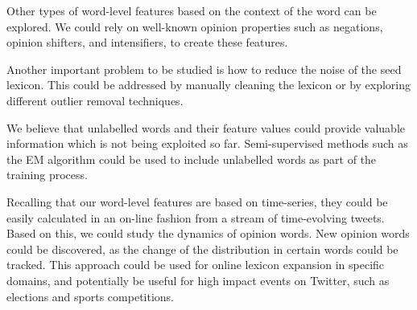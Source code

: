 \documentclass{sig-alternate}
\begin{document}
Other types of word-level features based on the context of the word can be explored. We could rely on well-known opinion properties such as negations, opinion shifters, and intensifiers, to create these features.

Another important problem to be studied is how to reduce the noise of the seed lexicon. This could be addressed by manually cleaning the lexicon or by exploring different outlier removal techniques.

We believe that unlabelled words and their feature values could provide valuable information which is not being exploited so far. Semi-supervised methods such as the EM algorithm \cite{nigam2006semi} could be used to include unlabelled words as part of the training process. 

Recalling that our word-level features are based on time-series, they could be easily calculated in an on-line fashion from a stream of time-evolving tweets. Based on this, we could study the dynamics of opinion words. New opinion words could be discovered, as the change of the distribution in certain words could be tracked. This approach could be used for online lexicon expansion in specific domains, and potentially be useful for high impact events on Twitter, such as elections and sports competitions.




\end{document}

